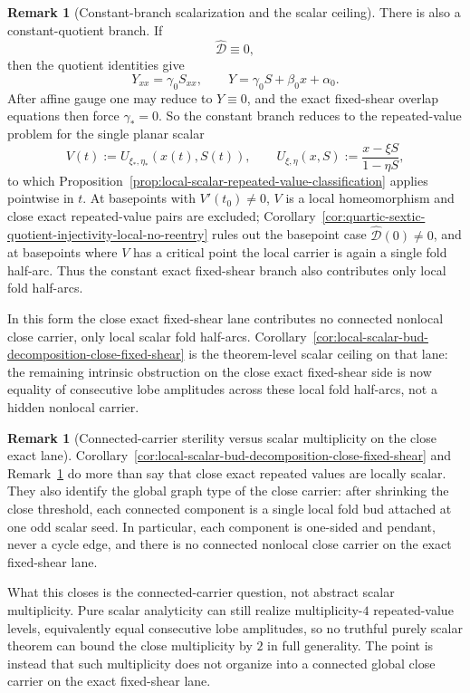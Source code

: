 \documentclass[11pt,a4paper]{amsart}
\theoremstyle{plain}
\theoremstyle{definition}
\newtheorem{remark}[theorem]{Remark}
\begin{document}
\begin{remark}[Constant-branch scalarization and the scalar ceiling]
\label{rem:constant-branch-scalarization-and-scalar-ceiling}
There is also a constant-quotient branch. If
\[
\widehat{\mathcal D}\equiv 0,
\]
then the quotient identities give
\[
Y_{xx}=\gamma_0 S_{xx},
\qquad
Y=\gamma_0 S+\beta_0 x+\alpha_0.
\]
After affine gauge one may reduce to $Y\equiv 0$, and the exact fixed-shear
overlap equations then force $\gamma_*=0$. So the constant branch reduces to
the repeated-value problem for the single planar scalar
\[
V(t):=U_{\xi_*,\eta_*}(x(t),S(t)),
\qquad
U_{\xi,\eta}(x,S):=\frac{x-\xi S}{1-\eta S},
\]
to which
Proposition~\ref{prop:local-scalar-repeated-value-classification} applies
pointwise in $t$. At basepoints with
$V'(t_0)\neq 0$, $V$ is a local homeomorphism and close exact repeated-value
pairs are excluded;
Corollary~\ref{cor:quartic-sextic-quotient-injectivity-local-no-reentry}
rules out the basepoint case $\widehat{\mathcal D}(0)\neq 0$, and at basepoints
where $V$ has a critical point the local carrier is again a single fold
half-arc. Thus the constant exact fixed-shear branch also contributes only
local fold half-arcs.

In this form the close exact fixed-shear lane contributes no connected
nonlocal close carrier, only local scalar fold half-arcs.
Corollary~\ref{cor:local-scalar-bud-decomposition-close-fixed-shear} is the
theorem-level scalar ceiling on that lane: the remaining intrinsic obstruction
on the close exact fixed-shear side is now equality of consecutive lobe
amplitudes across these local fold half-arcs, not a hidden nonlocal carrier.
\end{remark}

\begin{remark}[Connected-carrier sterility versus scalar multiplicity on the close exact lane]
\label{rem:connected-carrier-sterility-vs-scalar-multiplicity-close-lane}
Corollary~\ref{cor:local-scalar-bud-decomposition-close-fixed-shear} and
Remark~\ref{rem:constant-branch-scalarization-and-scalar-ceiling} do more than
say that close exact repeated values are locally scalar. They also identify the
global graph type of the close carrier: after shrinking the close threshold,
each connected component is a single local fold bud attached at one odd scalar
seed. In particular, each component is one-sided and pendant, never a cycle
edge, and there is no connected nonlocal close carrier on the exact fixed-shear
lane.

What this closes is the connected-carrier question, not abstract scalar
multiplicity. Pure scalar analyticity can still realize multiplicity-$4$
repeated-value levels, equivalently equal consecutive lobe amplitudes, so no
truthful purely scalar theorem can bound the close multiplicity by $2$ in full
generality. The point is instead that such multiplicity does not organize into a
connected global close carrier on the exact fixed-shear lane.
\end{remark}
\end{document}
